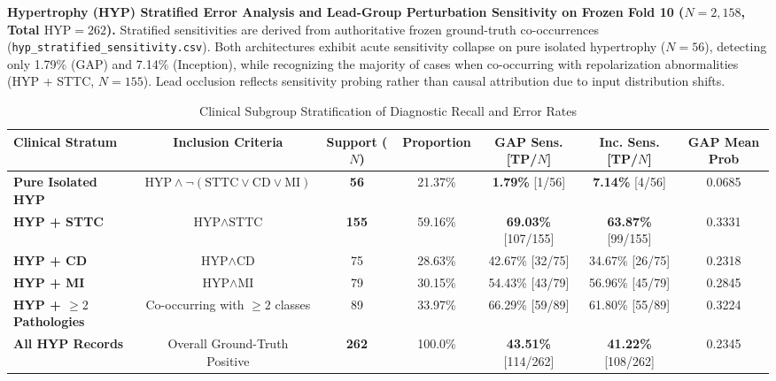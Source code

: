 \begin{table}[t]
\centering
\small
\caption{\textbf{Hypertrophy (HYP) Stratified Error Analysis and Lead-Group Perturbation Sensitivity on Frozen Fold 10 ($N = 2,158$, Total $\text{HYP} = 262$).} Stratified sensitivities are derived from authoritative frozen ground-truth co-occurrences (\texttt{hyp\_stratified\_sensitivity.csv}). Both architectures exhibit acute sensitivity collapse on pure isolated hypertrophy ($N = 56$), detecting only 1.79\% (GAP) and 7.14\% (Inception), while recognizing the majority of cases when co-occurring with repolarization abnormalities (HYP + STTC, $N = 155$). Lead occlusion reflects sensitivity probing rather than causal attribution due to input distribution shifts.}
\label{tab:hyp_analysis}
\begin{subtable}{\textwidth}
\centering
\caption{Clinical Subgroup Stratification of Diagnostic Recall and Error Rates}
\begin{tabular}{lcccccc}
\toprule
\textbf{Clinical Stratum} & \textbf{Inclusion Criteria} & \textbf{Support ($N$)} & \textbf{Proportion} & \textbf{GAP Sens. [TP/$N$]} & \textbf{Inc. Sens. [TP/$N$]} & \textbf{GAP Mean Prob} \\
\midrule
\textbf{Pure Isolated HYP} & $\text{HYP} \land \neg(\text{STTC} \lor \text{CD} \lor \text{MI})$ & \textbf{56} & 21.37\% & \textbf{1.79\%} [1/56] & \textbf{7.14\%} [4/56] & 0.0685 \\
\textbf{HYP + STTC} & $\text{HYP} \land \text{STTC}$ & \textbf{155} & 59.16\% & \textbf{69.03\%} [107/155] & \textbf{63.87\%} [99/155] & 0.3331 \\
\textbf{HYP + CD} & $\text{HYP} \land \text{CD}$ & 75 & 28.63\% & 42.67\% [32/75] & 34.67\% [26/75] & 0.2318 \\
\textbf{HYP + MI} & $\text{HYP} \land \text{MI}$ & 79 & 30.15\% & 54.43\% [43/79] & 56.96\% [45/79] & 0.2845 \\
\textbf{HYP + $\ge 2$ Pathologies} & Co-occurring with $\ge 2$ classes & 89 & 33.97\% & 66.29\% [59/89] & 61.80\% [55/89] & 0.3224 \\
\midrule
\textbf{All HYP Records} & Overall Ground-Truth Positive & \textbf{262} & 100.0\% & \textbf{43.51\%} [114/262] & \textbf{41.22\%} [108/262] & 0.2345 \\
\bottomrule
\end{tabular}
\end{subtable}

\vspace{0.3cm}


\end{table}
